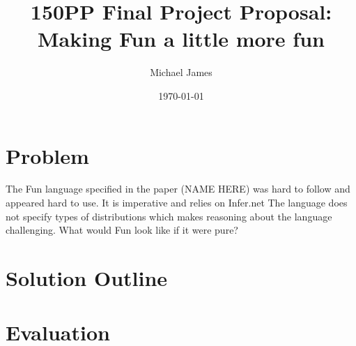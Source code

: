 \documentclass[11pt,twocolumn]{article}
\title{150PP Final Project Proposal: \\
Making Fun a little more fun}
\author{Michael James}
\date{\today}
\begin{document}
   \maketitle
\section{Problem}
The Fun language specified in the paper (NAME HERE) was hard to follow and appeared hard to use. It is imperative and relies on Infer.net The language does not specify types of distributions which makes reasoning about the language challenging. What would Fun look like if it were pure? 
\section{Solution Outline}

\section{Evaluation}
\end{document}
